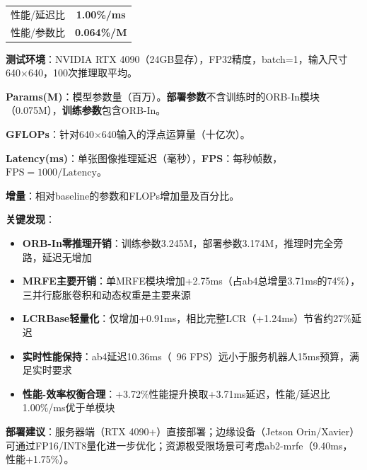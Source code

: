 \begin{table}[t]
\begin{tabular}{l|ccc|cc}
性能/延迟比 & \multicolumn{5}{c}{\textbf{1.00\%/ms}} \\
性能/参数比 & \multicolumn{5}{c}{\textbf{0.064\%/M}} \\
\hline
\end{tabular}
\begin{tablenotes}
\small
\item \textbf{测试环境}：NVIDIA RTX 4090（24GB显存），FP32精度，batch=1，输入尺寸640$\times$640，100次推理取平均。
\item \textbf{Params(M)}：模型参数量（百万）。\textbf{部署参数}不含训练时的ORB-In模块（0.075M），\textbf{训练参数}包含ORB-In。
\item \textbf{GFLOPs}：针对640$\times$640输入的浮点运算量（十亿次）。
\item \textbf{Latency(ms)}：单张图像推理延迟（毫秒），\textbf{FPS}：每秒帧数，$\text{FPS} = 1000 / \text{Latency}$。
\item \textbf{增量}：相对baseline的参数和FLOPs增加量及百分比。
\item \textbf{关键发现}：
  \begin{itemize}
    \item \textbf{ORB-In零推理开销}：训练参数3.245M，部署参数3.174M，推理时完全旁路，延迟无增加
    \item \textbf{MRFE主要开销}：单MRFE模块增加+2.75ms（占ab4总增量3.71ms的74\%），三并行膨胀卷积和动态权重是主要来源
    \item \textbf{LCRBase轻量化}：仅增加+0.91ms，相比完整LCR（+1.24ms）节省约27\%延迟
    \item \textbf{实时性能保持}：ab4延迟10.36ms（~96 FPS）远小于服务机器人15ms预算，满足实时要求
    \item \textbf{性能-效率权衡合理}：+3.72\%性能提升换取+3.71ms延迟，性能/延迟比1.00\%/ms优于单模块
  \end{itemize}
\item \textbf{部署建议}：服务器端（RTX 4090+）直接部署；边缘设备（Jetson Orin/Xavier）可通过FP16/INT8量化进一步优化；资源极受限场景可考虑ab2-mrfe（9.40ms，性能+1.75\%）。
\end{tablenotes}
\end{table}
